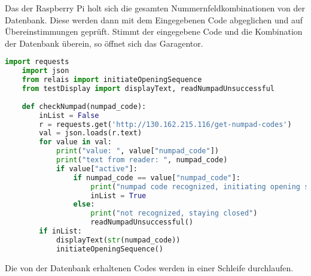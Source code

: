 Das der Raspberry Pi holt sich die gesamten Nummernfeldkombinationen von der Datenbank. Diese werden dann mit dem Eingegebenen Code abgeglichen und auf Übereinstimmungen geprüft. Stimmt der eingegebene Code und die Kombination der Datenbank überein, so öffnet sich das Garagentor. 
\begin{lstlisting}[language=python, caption=checkNumpad.py]
    import requests
    import json
    from relais import initiateOpeningSequence
    from testDisplay import displayText, readNumpadUnsuccessful
    
    def checkNumpad(numpad_code):
        inList = False
        r = requests.get('http://130.162.215.116/get-numpad-codes')
        val = json.loads(r.text)
        for value in val:
            print("value: ", value["numpad_code"])
            print("text from reader: ", numpad_code)
            if value["active"]:
                if numpad_code == value["numpad_code"]:
                    print("numpad code recognized, initiating opening sequence")
                    inList = True
                else:
                    print("not recognized, staying closed")
                    readNumpadUnsuccessful()
        if inList:
            displayText(str(numpad_code))
            initiateOpeningSequence()    
\end{lstlisting}

Die von der Datenbank erhaltenen Codes werden in einer Schleife durchlaufen. 

